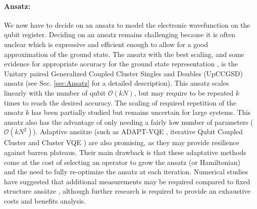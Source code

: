 \paragraph{Ansatz:} We now have to decide on an ansatz to model the electronic wavefunction on the qubit register. Deciding on an ansatz remains challenging because it is often unclear which is expressive and efficient enough to allow for a good approximation of the ground state. The ansatz with the best scaling, and some evidence for appropriate accuracy for the ground state representation \cite{Grimsley2019_UCC_Review}, is the Unitary paired Generalized Coupled Cluster Singles and Doubles (UpCCGSD) ansatz \cite{Lee2019} (see Sec. \ref{sec:Ansatz} for a detailed description). This ansatz scales linearly with the number of qubit $\mathcal{O}(kN)$, but may require to be repeated $k$ times to reach the desired accuracy. The scaling of required repetition of the ansatz $k$ has been partially studied \cite{Lee2019} but remains uncertain for large systems. This ansatz also has the advantage of only needing a fairly low number of parameters ($\mathcal{O}(kN^2)$). Adaptive ans\"atze (such as ADAPT-VQE \cite{Grimsley2019}, iterative Qubit Coupled Cluster \cite{Ryabinkin2020} and Cluster VQE \cite{Zhang2020}) are also promising, as they may provide resilience against barren plateaus. Their main drawback is that these adaptative methods come at the cost of selecting an operator to grow the ansatz (or Hamiltonian) and the need to fully re-optimize the ansatz at each iteration. Numerical studies have suggested that additional measurements may be required compared to fixed structure ans\"atze \cite{Claudino2020}, although further research is required to provide an exhaustive costs and benefits analysis.

